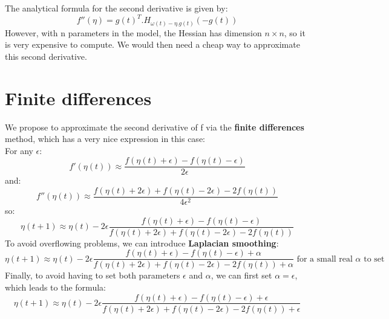 \documentclass[]{article}
\begin{document}
The analytical formula for the second derivative is given by:\\
\begin{equation}
f''(\eta) = g(t)^{T}.H_{\omega(t)-\eta.g(t)}(-g(t))
\end{equation}
However, with n parameters in the model, the Hessian has dimension $n \times n$, so it is very expensive to compute. We would then need a cheap way to approximate this second derivative. 

\section{Finite differences}
We propose to approximate the second derivative of f via the \textbf{finite differences} method, which has a very nice expression in this case:\\
For any $\epsilon$:\\
\begin{equation}
f'(\eta(t)) \approx \frac{f(\eta(t)+\epsilon)-f(\eta(t)-\epsilon)}{2\epsilon}
\end{equation}
and:\\
\begin{equation}
f''(\eta(t)) \approx \frac{f(\eta(t)+2\epsilon)+f(\eta(t)-2\epsilon)-2f(\eta(t))}{4\epsilon^{2}}
\end{equation}
so:\\
\begin{equation}
\eta(t+1) \approx \eta(t) -2\epsilon\frac{f(\eta(t)+\epsilon)-f(\eta(t)-\epsilon)}{f(\eta(t)+2\epsilon)+f(\eta(t)-2\epsilon)-2f(\eta(t))}
\end{equation}
To avoid overflowing problems, we can introduce \textbf{Laplacian smoothing}:
\begin{equation}
\eta(t+1) \approx \eta(t) -2\epsilon\frac{f(\eta(t)+\epsilon)-f(\eta(t)-\epsilon) + \alpha}{f(\eta(t)+2\epsilon)+f(\eta(t)-2\epsilon)-2f(\eta(t)) + \alpha} \text{ for a small real $\alpha$ to set}
\end{equation}
Finally, to avoid having to set both parameters $\epsilon$ and $\alpha$, we can first set $\alpha=\epsilon$, which leads to the formula:
\begin{equation}
\eta(t+1) \approx \eta(t) -2\epsilon\frac{f(\eta(t)+\epsilon)-f(\eta(t)-\epsilon) + \epsilon}{f(\eta(t)+2\epsilon)+f(\eta(t)-2\epsilon)-2f(\eta(t)) + \epsilon} 
\end{equation}
\end{document}
